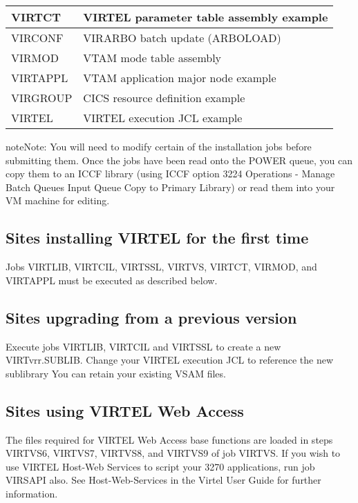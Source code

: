 \documentclass[letterpaper,10pt,english]{sphinxmanual}
\begin{document}
\begin{savenotes}
\begin{tabulary}{\linewidth}[t]{|T|T|}
\hline
VIRTCT
&
VIRTEL parameter table assembly example
\\
\hline
VIRCONF
&
VIRARBO batch update (ARBOLOAD)
\\
\hline
VIRMOD
&
VTAM mode table assembly
\\
\hline
VIRTAPPL
&
VTAM application major node example
\\
\hline
VIRGROUP
&
CICS resource definition example
\\
\hline
VIRTEL
&
VIRTEL execution JCL example
\\
\hline
\end{tabulary}
\par
\sphinxattableend\end{savenotes}

\begin{sphinxadmonition}{note}{Note:}
You will need to modify certain of the installation jobs before submitting them. Once the jobs have been read onto the POWER queue, you can copy them to an ICCF library (using ICCF option 3224 Operations - Manage Batch Queues \textendash{} Input Queue \textendash{} Copy to Primary Library) or read them into your VM machine for editing.
\end{sphinxadmonition}


\subsection{Sites installing VIRTEL for the first time}
\label{\detokenize{Installation_Guide:sites-installing-virtel-for-the-first-time}}
Jobs VIRTLIB, VIRTCIL, VIRTSSL, VIRTVS, VIRTCT, VIRMOD, and VIRTAPPL must be executed as described below.


\subsection{Sites upgrading from a previous version}
\label{\detokenize{Installation_Guide:sites-upgrading-from-a-previous-version}}
Execute jobs VIRTLIB, VIRTCIL and VIRTSSL to create a new VIRTvrr.SUBLIB. Change your VIRTEL execution JCL to reference the new sublibrary You can retain your existing VSAM files.


\subsection{Sites using VIRTEL Web Access}
\label{\detokenize{Installation_Guide:sites-using-virtel-web-access}}
The files required for VIRTEL Web Access base functions are loaded in steps VIRTVS6, VIRTVS7, VIRTVS8, and VIRTVS9 of job VIRTVS. If you wish to use VIRTEL Host-Web Services to script your 3270 applications, run job VIRSAPI also. See Host-Web-Services in the Virtel User Guide for further information.
\end{document}
